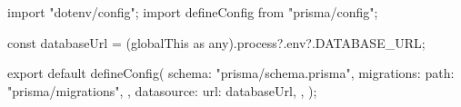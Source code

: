 
import "dotenv/config";
import { defineConfig } from "prisma/config";

const databaseUrl = (globalThis as any).process?.env?.DATABASE_URL;

export default defineConfig({
  schema: "prisma/schema.prisma",
  migrations: {
    path: "prisma/migrations",
  },
  datasource: {
    url: databaseUrl,
  },
});
